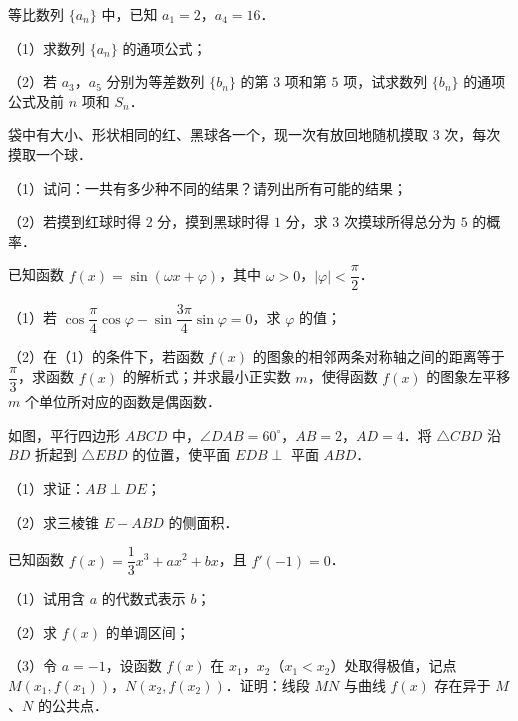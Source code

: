 \begin{question}
等比数列 $\{a_n\}$ 中，已知 $a_1=2$，$a_4=16$．

（1）求数列 $\{a_n\}$ 的通项公式；

（2）若 $a_3$，$a_5$ 分别为等差数列 $\{b_n\}$ 的第 $3$ 项和第 $5$ 项，试求数列 $\{b_n\}$ 的通项公式及前 $n$ 项和 $S_n$．

\end{question}
\begin{question}
袋中有大小、形状相同的红、黑球各一个，现一次有放回地随机摸取 $3$ 次，每次摸取一个球．

（1）试问：一共有多少种不同的结果？请列出所有可能的结果；

（2）若摸到红球时得 $2$ 分，摸到黑球时得 $1$ 分，求 $3$ 次摸球所得总分为 $5$ 的概率．

\end{question}
\begin{question}
已知函数 $f(x)=\sin(\omega x+\varphi)$，其中 $\omega>0$，$|\varphi|<\dfrac\pi2$．

（1）若 $\cos\dfrac\pi4\cos\varphi-\sin\dfrac{3\pi}4\sin\varphi=0$，求 $\varphi$ 的值；

（2）在（1）的条件下，若函数 $f(x)$ 的图象的相邻两条对称轴之间的距离等于 $\dfrac\pi3$，求函数 $f(x)$ 的解析式；并求最小正实数 $m$，使得函数 $f(x)$ 的图象左平移 $m$ 个单位所对应的函数是偶函数．

\Needspace{0.4\textheight}
\end{question}
\begingroup
\renewenvironment{question}{\Needspace{0.5\textheight}}{}
\begin{question}
如图，平行四边形 $ABCD$ 中，$\angle DAB=60^\circ$，$AB=2$，$AD=4$．将 $\triangle CBD$ 沿 $BD$ 折起到 $\triangle EBD$ 的位置，使平面 $EDB\perp$ 平面 $ABD$．

（1）求证：$AB\perp DE$；

（2）求三棱锥 $E-ABD$ 的侧面积．
\nopagebreak[4]
\begin{center}\end{center}
\nopagebreak[4]
\end{question}
\endgroup
\begin{question}
已知函数 $f(x)=\dfrac13x^3+ax^2+bx$，且 $f'(-1)=0$．

（1）试用含 $a$ 的代数式表示 $b$；

（2）求 $f(x)$ 的单调区间；

（3）令 $a=-1$，设函数 $f(x)$ 在 $x_1$，$x_2$（$x_1<x_2$）处取得极值，记点 $M(x_1,f(x_1))$，$N(x_2,f(x_2))$．证明：线段 $MN$ 与曲线 $f(x)$ 存在异于 $M$、$N$ 的公共点．

\Needspace{0.4\textheight}
\end{question}
